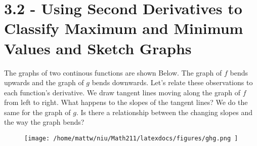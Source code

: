 \documentclass{report}
\begin{document}
\pagebreak
\section*{3.2 - Using Second Derivatives to Classify Maximum and Minimum Values and Sketch Graphs}
\bigbreak \noindent
The graphs of two continous functions are shown Below. The graph of $f$ bends upwards and the graph of $g$ bends downwards. Let's relate these observations to each function's derivative.
\bigbreak \noindent
We draw tangent lines moving along the graph of $f$ from left to right. What happens to the slopes of the tangent lines? We do the same for the graph of $g$. Is there a relationship between the changing slopes and the way the graph bends?
\bigbreak \noindent
\begin{figure}[ht]
\centering
\texttt{[image:  /home/mattw/niu/Math211/latexdocs/figures/ghg.png  ]}
\end{figure}
\end{document}
